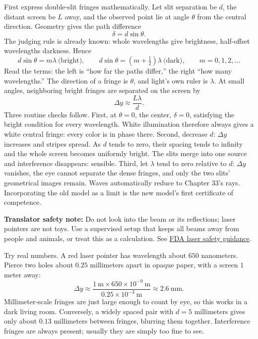 \begin{mainline}
First express double-slit fringes mathematically. Let slit separation be \(d\), the distant screen be \(L\) away, and the observed point lie at angle \(\theta\) from the central direction. Geometry gives the path difference
\[
  \delta = d\sin\theta .
\]
The judging rule is already known: whole wavelengths give brightness, half-offset wavelengths darkness. Hence
\[
  d\sin\theta = m\lambda \ \text{(bright)},\qquad
  d\sin\theta = \left(m+\tfrac12\right)\lambda \ \text{(dark)},\qquad m=0,1,2,\dots
\]
Read the terms: the left is ``how far the paths differ,'' the right ``how many wavelengths.'' The direction of a fringe is \(\theta\), and light's own ruler is \(\lambda\). At small angles, neighboring bright fringes are separated on the screen by
\[
  \Delta y \approx \frac{L\lambda}{d}.
\]
Three routine checks follow. First, at \(\theta=0\), the center, \(\delta=0\), satisfying the bright condition for every wavelength. White illumination therefore always gives a white central fringe: every color is in phase there. Second, decrease \(d\): \(\Delta y\) increases and stripes spread. As \(d\) tends to zero, their spacing tends to infinity and the whole screen becomes uniformly bright. The slits merge into one source and interference disappears: sensible. Third, let \(\lambda\) tend to zero relative to \(d\): \(\Delta y\) vanishes, the eye cannot separate the dense fringes, and only the two slits' geometrical images remain. Waves automatically reduce to Chapter 33's rays. Incorporating the old model as a limit is the new model's first certificate of competence.

\textbf{Translator safety note:} Do not look into the beam or its reflections; laser pointers are not toys. Use a supervised setup that keeps all beams away from people and animals, or treat this as a calculation. See \href{https://www.fda.gov/consumers/consumer-updates/laser-toys-how-keep-kids-safe}{FDA laser safety guidance}.

Try real numbers. A red laser pointer has wavelength about \(650\) nanometers. Pierce two holes about \(0.25\) millimeters apart in opaque paper, with a screen \(1\) meter away:
\[
  \Delta y \approx \frac{1\ \text{m}\times 650\times10^{-9}\ \text{m}}{0.25\times10^{-3}\ \text{m}}
  \approx 2.6\ \text{mm}.
\]
Millimeter-scale fringes are just large enough to count by eye, so this works in a dark living room. Conversely, a widely spaced pair with \(d=5\) millimeters gives only about \(0.13\) millimeters between fringes, blurring them together. Interference fringes are always present; usually they are simply too fine to see.


\end{mainline}

